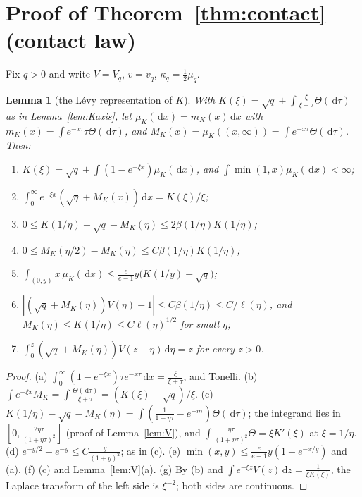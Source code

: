 \documentclass[11pt]{amsart}
\newcommand{\dd}{\,\mathrm{d}}
\newtheorem{lemma}[theorem]{Lemma}
\theoremstyle{definition}
\theoremstyle{remark}
\numberwithin{equation}{section}
\begin{document}
\section{Proof of Theorem~\ref{thm:contact} (contact law)}\label{app:T2}

Fix $q>0$ and write $V=V_q$, $v=v_q$, $\kappa_q=\frac12\mu_q$.

\begin{lemma}[the L\'evy representation of $K$]\label{lem:Klevy}
With $K(\xi)=\sqrt q+\int\frac\xi{\xi+\tau}\Theta(\dd\tau)$ as in Lemma~\ref{lem:Kaxis}, let $\mu_K(\dd x)=m_K(x)\dd x$ with $m_K(x)=\int e^{-x\tau}\tau\Theta(\dd\tau)$, and $M_K(x)=\mu_K((x,\infty))=\int e^{-x\tau}\Theta(\dd\tau)$. Then:
\begin{enumerate}
\item[(a)] $K(\xi)=\sqrt q+\int(1-e^{-\xi x})\mu_K(\dd x)$, and $\int\min(1,x)\mu_K(\dd x)<\infty$;
\item[(b)] $\int_0^\infty e^{-\xi x}(\sqrt q+M_K(x))\dd x=K(\xi)/\xi$;
\item[(c)] $0\le K(1/\eta)-\sqrt q-M_K(\eta)\le2\beta(1/\eta)K(1/\eta)$;
\item[(d)] $0\le M_K(\eta/2)-M_K(\eta)\le C\beta(1/\eta)K(1/\eta)$;
\item[(e)] $\int_{(0,y)}x\,\mu_K(\dd x)\le\frac e{e-1}y\bigl(K(1/y)-\sqrt q\bigr)$;
\item[(f)] $|(\sqrt q+M_K(\eta))V(\eta)-1|\le C\beta(1/\eta)\le C/\ell(\eta)$, and $M_K(\eta)\le K(1/\eta)\le C\ell(\eta)^{1/2}$ for small $\eta$;
\item[(g)] $\int_0^z(\sqrt q+M_K(\eta))V(z-\eta)\dd\eta=z$ for every $z>0$.
\end{enumerate}
\end{lemma}

\begin{proof}
(a) $\int_0^\infty(1-e^{-\xi x})\tau e^{-x\tau}\dd x=\frac\xi{\xi+\tau}$, and Tonelli. (b) $\int e^{-\xi x}M_K=\int\frac{\Theta(\dd\tau)}{\xi+\tau}=(K(\xi)-\sqrt q)/\xi$. (c) $K(1/\eta)-\sqrt q-M_K(\eta)=\int(\frac1{1+\eta\tau}-e^{-\eta\tau})\Theta(\dd\tau)$; the integrand lies in $[0,\frac{2\eta\tau}{(1+\eta\tau)^2}]$ (proof of Lemma~\ref{lem:V}), and $\int\frac{\eta\tau}{(1+\eta\tau)^2}\Theta=\xi K'(\xi)$ at $\xi=1/\eta$. (d) $e^{-y/2}-e^{-y}\le C\frac y{(1+y)^2}$; as in (c). (e) $\min(x,y)\le\frac e{e-1}y(1-e^{-x/y})$ and (a). (f) (c) and Lemma~\ref{lem:V}(a). (g) By (b) and $\int e^{-\xi z}V(z)\dd z=\frac1{\xi K(\xi)}$, the Laplace transform of the left side is $\xi^{-2}$; both sides are continuous.
\end{proof}
\end{document}
